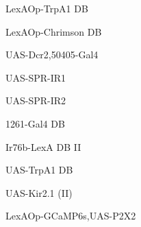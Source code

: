 \documentclass[17pt]{extarticle}
\begin{document}
\footnotesize
\newpage\vspace*{-0.15cm}
\begin{normalsize}
LexAOp-TrpA1 DB \\[0.5em]
\end{normalsize}
\footnotesize
\newpage\vspace*{-0.15cm}
\begin{footnotesize}
LexAOp-Chrimson DB \\[0.5em]
\end{footnotesize}
\footnotesize
\newpage\vspace*{-0.15cm}
\begin{footnotesize}
UAS-Dcr2,50405-Gal4 \\[0.5em]
\end{footnotesize}
\footnotesize
\newpage\vspace*{-0.15cm}
\begin{normalsize}
UAS-SPR-IR1 \\[0.5em]
\end{normalsize}
\footnotesize
\newpage\vspace*{-0.15cm}
\begin{normalsize}
UAS-SPR-IR2 \\[0.5em]
\end{normalsize}
\footnotesize
\newpage\vspace*{-0.15cm}
\begin{normalsize}
1261-Gal4 DB \\[0.5em]
\end{normalsize}
\footnotesize
\newpage\vspace*{-0.15cm}
\begin{footnotesize}
Ir76b-LexA DB II \\[0.5em]
\end{footnotesize}
\footnotesize
\newpage\vspace*{-0.15cm}
\begin{normalsize}
UAS-TrpA1 DB \\[0.5em]
\end{normalsize}
\footnotesize
\newpage\vspace*{-0.15cm}
\begin{normalsize}
UAS-Kir2.1 (II) \\[0.5em]
\end{normalsize}
\footnotesize
\newpage\vspace*{-0.15cm}
\begin{footnotesize}
LexAOp-GCaMP6s,UAS-P2X2 \\[0.5em]
\end{footnotesize}
\end{document}
